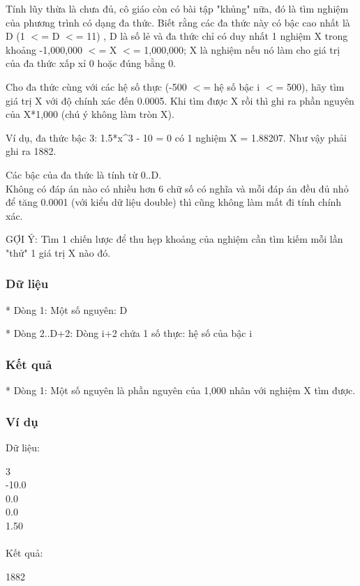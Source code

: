 



   Tính lũy thừa là chưa đủ, cô giáo còn có bài tập "khủng" nữa, đó là tìm nghiệm của phương trình có dạng đa thức. Biết rằng các đa thức này có bậc cao nhất là D (1 $<$= D $<$= 11) , D là số lẻ và đa thức chỉ có duy nhất 1 nghiệm X trong khoảng -1,000,000 $<$= X $<$= 1,000,000; X là nghiệm nếu nó làm cho giá trị của đa thức xấp xỉ 0 hoặc đúng bằng 0.  

   Cho đa thức cùng với các hệ số thực (-500 $<$= hệ số bậc i $<$= 500), hãy tìm giá trị X với độ chính xác đến 0.0005. Khi tìm được X rồi thì ghi ra phần nguyên của X*1,000 (chú ý không làm tròn X).  

   Ví dụ, đa thức bậc 3: 1.5*x\textasciicircum3 - 10 = 0 có 1 nghiệm X = 1.88207. Như vậy phải ghi ra 1882.  

   Các bậc của đa thức là tính từ 0..D.   
\\

   Không có đáp án nào có nhiều hơn 6 chữ số có nghĩa và mỗi đáp án đều đủ nhỏ  để tăng 0.0001 (với kiểu dữ liệu double) thì cũng không làm mất đi tính chính xác.  

   GỢI Ý: Tìm 1 chiến lược để thu hẹp khoảng của nghiệm cần tìm kiếm mỗi lần "thử" 1 giá trị X nào đó.  

\subsubsection{   Dữ liệu  }

   * Dòng 1: Một số nguyên: D  

   * Dòng 2..D+2: Dòng i+2 chứa 1 số thực: hệ số của bậc i  

\subsubsection{   Kết quả  }

   * Dòng 1: Một số nguyên là phần nguyên của 1,000 nhân với nghiệm X tìm được.  

\subsubsection{   Ví dụ  }

   Dữ liệu:  

   3   
\\   -10.0   
\\   0.0   
\\   0.0   
\\   1.50   
\\


\\   Kết quả:  

   1882  